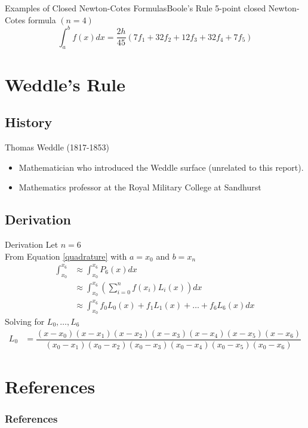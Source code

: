 \documentclass{beamer}
\begin{document}
\begin{frame}{Examples of Closed Newton-Cotes Formulas}{Boole's Rule}
    5-point closed Newton-Cotes formula $\left(n = 4\right)$
    \begin{equation}
      \int_a^b f(x) dx = \dfrac{2h}{45} \left(7f_1 + 32f_2 + 12f_3 + 32f_4 + 7f_5\right)
    \end{equation}
\end{frame}

\section{Weddle's Rule}

\subsection{History}

\begin{frame}{Thomas Weddle (1817-1853) \cite{thomas_weddle}}
  \begin{itemize}
    \item Mathematician who introduced the Weddle surface (unrelated to this report).
    \item Mathematics professor at the Royal Military College at Sandhurst 
  \end{itemize}
\end{frame}

\subsection{Derivation}

\begin{frame}[allowframebreaks]{Derivation}
  Let $n = 6$ \\
  From Equation \ref{quadrature} with $a = x_0$ and $b = x_n$
  \begin{equation*}
    \begin{aligned}
      \int_{x_0}^{x_6} &\approx \int_{x_0}^{x_6} P_{6}(x) dx \\
      &\approx \int_{x_0}^{x_6} \left(\sum_{i=0}^{n} f(x_i) L_i(x)\right) dx \\ 
      &\approx \int_{x_0}^{x_6} f_0 L_0(x) + f_1 L_1(x) + \dots + f_6 L_6(x) dx
    \end{aligned}
  \end{equation*}
  Solving for $L_0,\dots,L_6$
  \begin{equation*}
    \begin{aligned}
      L_0 &= \dfrac{(x - x_0)(x - x_1)(x - x_2)(x - x_3)(x - x_4)(x - x_5)(x - x_6)}{(x_0 - x_1)(x_0 - x_2)(x_0 - x_3)(x_0 - x_4)(x_0 - x_5)(x_0 - x_6)}
    \end{aligned}
  \end{equation*}
\end{frame}

\section{References}

\begin{frame}[t,allowframebreaks]
  \frametitle{References}
  \printbibliography
\end{frame}
\end{document}
